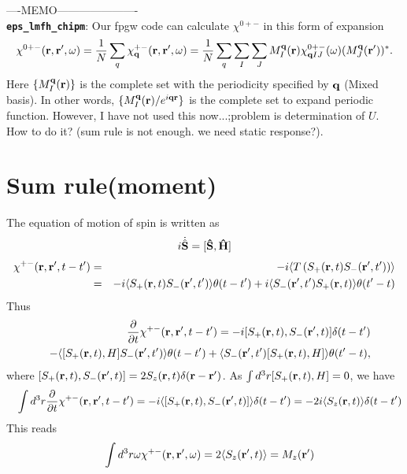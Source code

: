 \documentclass[a4paper,10pt,epsf,fleqn]{article}
\newcommand{\bfq}{{\bf q}}
\newcommand{\bfr}{{\bf r}}
\begin{document}
{{{\noindent ----MEMO----------------------\\
{\bf \tt eps\_lmfh\_chipm}: Our fpgw code can calculate
$\chi^{0+-}$ in this form of expansion
\begin{eqnarray}
\chi^{0+-}(\bfr,\bfr',\omega) 
= \frac{1}{N}\sum_q \chi^{+-}_\bfq(\bfr,\bfr',\omega)
= \frac{1}{N}\sum_q \sum_I \sum_J
M^\bfq_I(\bfr) \chi^{0+-}_{\bfq IJ}(\omega) (M^\bfq_J(\bfr'))^*.
\label{chiexpand}
\end{eqnarray}
Here $\{ M^\bfq_I(\bfr) \}$ is the complete set with the periodicity specified 
by $\bfq$ (Mixed basis).
In other words, $\{ M^\bfq_I(\bfr) /e^{i \bfq \bfr} \}$ 
is the complete set to expand periodic function.
However, I have not used this now...;problem is determination of $U$. How to do it?
(sum rule is not enough. we need static response?).


\section{Sum rule(moment)} 
The equation of motion of spin is written as
\begin{eqnarray}
i \dot{\hat{\bf S}} = [\hat{\bf S},  \hat{H}]
\end{eqnarray}
\begin{eqnarray}
\chi^{+-}(\bfr,\bfr',t-t') 
&=& -i\langle T\left( S_+(\bfr,t) S_-(\bfr',t') \right) \rangle                \nonumber\\
&=& -i\langle S_+(\bfr,t)   S_-(\bfr',t') \rangle \theta(t-t')
+ i\langle S_-(\bfr',t') S_+(\bfr,t)   \rangle \theta(t'-t)
\end{eqnarray}
Thus
\begin{eqnarray}
&&\frac{\partial }{\partial t} \chi^{+-}(\bfr,\bfr',t-t') 
= -i [S_+(\bfr,t),   S_-(\bfr',t)] \delta(t-t') \nonumber\\
&&-  \langle [S_+(\bfr,t),H]   S_-(\bfr',t') \rangle \theta(t-t') 
+  \langle S_-(\bfr',t')   [S_+(\bfr,t),H] \rangle \theta(t'-t),
\end{eqnarray}
where $[S_+(\bfr,t), S_-(\bfr',t)]= 2S_z(\bfr,t) \delta(\bfr-\bfr')$.
As $\int d^3r [S_+(\bfr,t),H]=0$, we have
\begin{eqnarray}
&&\int d^3r \frac{\partial }{\partial t} \chi^{+-}(\bfr,\bfr',t-t') 
= -i \langle [S_+(\bfr,t),   S_-(\bfr',t)] \rangle \delta(t-t') 
= -2 i \langle S_z(\bfr,t) \rangle \delta(t-t') 
\end{eqnarray}
This reads
\begin{eqnarray}
&&\int d^3r \omega \chi^{+-}(\bfr,\bfr',\omega) 
= 2 \langle S_z(\bfr',t) \rangle = M_z(\bfr') 
\end{eqnarray}

}}}
\end{document}
